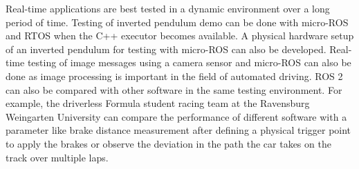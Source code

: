 \documentclass[%
xelatex,
	oneside,		%
	12pt,			%
	parskip=half,	%
	abstracton,
	chapterprefix=true%
    appendixprefix=true]
{scrbook}
\begin{document}
 Real-time applications are best tested in a dynamic environment over a long period of time. Testing of inverted pendulum demo can be done with micro-ROS and RTOS when the C++ executor becomes available. A physical hardware setup of an inverted pendulum for testing with micro-ROS can also be developed.
Real-time testing of image messages using a camera sensor and micro-ROS can also be done as image processing is important in the field of automated driving.
ROS 2 can also be compared with other software in the same testing environment. For example, the driverless Formula student racing team at the Ravensburg Weingarten University can compare the performance of different software with a parameter like brake distance measurement after defining a physical trigger point to apply the brakes or observe the deviation in the path the car takes on the track over multiple laps.

	\listoffigures
	\listoftables
		
		

\end{document}
